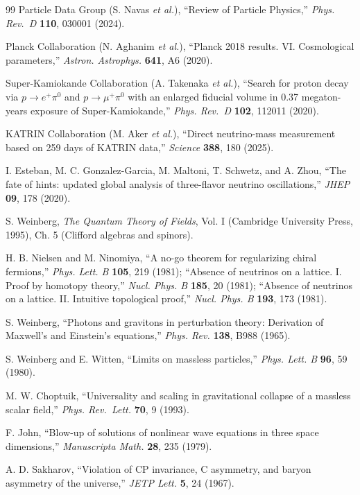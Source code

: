 \documentclass[aps,prd,twocolumn,amsmath,amssymb,superscriptaddress,nofootinbib,floatfix]{revtex4-2}
\begin{document}
\begin{thebibliography}{99}
 Particle Data Group (S. Navas \emph{et al.}), ``Review of Particle
Physics,'' \emph{Phys. Rev.~D} \textbf{110}, 030001 (2024).

 Planck Collaboration (N. Aghanim \emph{et al.}), ``Planck 2018 results.
VI. Cosmological parameters,'' \emph{Astron. Astrophys.} \textbf{641},
A6 (2020).

 Super-Kamiokande Collaboration (A. Takenaka \emph{et al.}), ``Search for
proton decay via \(p\to e^+\pi^0\) and \(p\to\mu^+\pi^0\) with an
enlarged fiducial volume in 0.37 megaton-years exposure of
Super-Kamiokande,'' \emph{Phys. Rev.~D} \textbf{102}, 112011 (2020).

 KATRIN Collaboration (M. Aker \emph{et al.}), ``Direct neutrino-mass
measurement based on 259 days of KATRIN data,'' \emph{Science}
\textbf{388}, 180 (2025).

 I. Esteban, M. C. Gonzalez-Garcia, M. Maltoni, T. Schwetz, and A. Zhou,
``The fate of hints: updated global analysis of three-flavor neutrino
oscillations,'' \emph{JHEP} \textbf{09}, 178 (2020).

 S. Weinberg, \emph{The Quantum Theory of Fields}, Vol. I (Cambridge
University Press, 1995), Ch. 5 (Clifford algebras and spinors).

 H. B. Nielsen and M. Ninomiya, ``A no-go theorem for regularizing chiral
fermions,'' \emph{Phys. Lett. B} \textbf{105}, 219 (1981); ``Absence of
neutrinos on a lattice. I. Proof by homotopy theory,'' \emph{Nucl. Phys.
B} \textbf{185}, 20 (1981); ``Absence of neutrinos on a lattice. II.
Intuitive topological proof,'' \emph{Nucl. Phys. B} \textbf{193}, 173
(1981).

 S. Weinberg, ``Photons and gravitons in perturbation theory: Derivation
of Maxwell's and Einstein's equations,'' \emph{Phys. Rev.} \textbf{138},
B988 (1965).

 S. Weinberg and E. Witten, ``Limits on massless particles,'' \emph{Phys.
Lett. B} \textbf{96}, 59 (1980).

 M. W. Choptuik, ``Universality and scaling in gravitational collapse of
a massless scalar field,'' \emph{Phys. Rev.~Lett.} \textbf{70}, 9
(1993).

 F. John, ``Blow-up of solutions of nonlinear wave equations in three
space dimensions,'' \emph{Manuscripta Math.} \textbf{28}, 235 (1979).

 A. D. Sakharov, ``Violation of CP invariance, C asymmetry, and baryon
asymmetry of the universe,'' \emph{JETP Lett.} \textbf{5}, 24 (1967).


\end{thebibliography}
\end{document}
